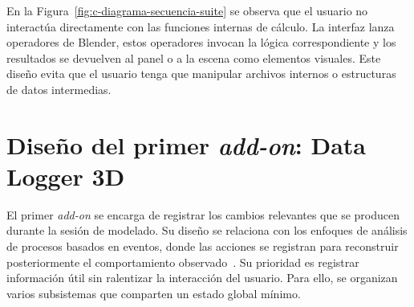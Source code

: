 En la Figura~\ref{fig:c-diagrama-secuencia-suite} se observa que el usuario no interactúa directamente con las funciones internas de cálculo. La interfaz lanza operadores de Blender, estos operadores invocan la lógica correspondiente y los resultados se devuelven al panel o a la escena como elementos visuales. Este diseño evita que el usuario tenga que manipular archivos internos o estructuras de datos intermedias.

\section{Diseño del primer \textit{add-on}: Data Logger 3D}
\label{sec:c-diseno-logger}

El primer \textit{add-on} se encarga de registrar los cambios relevantes que se producen durante la sesión de modelado. Su diseño se relaciona con los enfoques de análisis de procesos basados en eventos, donde las acciones se registran para reconstruir posteriormente el comportamiento observado~\cite{vanderalst2016process}. Su prioridad es registrar información útil sin ralentizar la interacción del usuario. Para ello, se organizan varios subsistemas que comparten un estado global mínimo.

